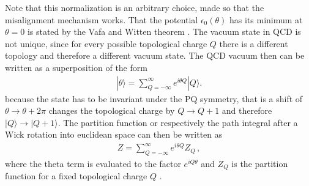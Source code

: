\documentclass[twoside,a4paper, 12pt]{article}
\numberwithin{equation}{section}
\begin{document}
Note that this normalization is an arbitrary choice, made so that the misalignment mechanism works.
That the potential $\epsilon_0(\theta)$ has its minimum at $\theta = 0$ is stated by the Vafa and Witten theorem \cite{VafaWitten}.
The vacuum state in QCD is not unique, since for every possible topological charge $Q$
there is a different topology and therefore a different vacuum state.
The QCD vacuum then can be written as a superposition of the form
\begin{align*}
    |\theta \rangle  = \sum_{Q = - \infty}^{\infty} e^{i \theta Q} |Q \rangle.
\end{align*}
because the state has to be invariant under the PQ symmetry, that is a shift of $\theta \rightarrow \theta + 2 \pi$  
changes the topological charge by $Q \rightarrow Q + 1$ and therefore $| Q \rangle \rightarrow |Q + 1 \rangle$.
The partition function or respectively the path integral after a Wick rotation into euclidean space can then be written as
\begin{align*}
    Z = \sum_{Q = - \infty}^\infty e^{i \theta Q}Z_Q \, ,
\end{align*}
where the theta term is evaluated to the factor $e^{i Q \theta}$ and
$Z_Q$ is the partition function for a fixed topological charge $Q$ \cite[Sec. II, Eq. 2.7]{Leutwyler:1992yt}.
\end{document}
